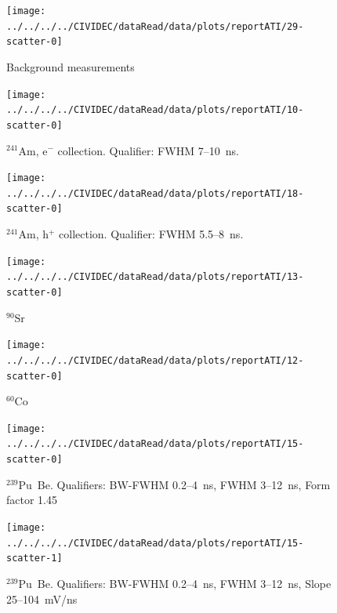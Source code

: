 \documentclass[12pt]{packages/mytustyle}  %
\begin{document}
 

% 

\clearpage
\begin{figure}[!t]
\centering
\texttt{[image: ../../../../CIVIDEC/dataRead/data/plots/reportATI/29-scatter-0]}
\caption{Background measurements}
\label{fig:scatterbm}
\end{figure}

\clearpage
\begin{figure}[!t]
\centering
\texttt{[image: ../../../../CIVIDEC/dataRead/data/plots/reportATI/10-scatter-0]}
\caption{$^{241}$Am, e$^{-}$ collection. Qualifier: FWHM 7--10~ns.}
\label{fig:scatterae}
\end{figure}

\clearpage
\begin{figure}[!t]
\centering
\texttt{[image: ../../../../CIVIDEC/dataRead/data/plots/reportATI/18-scatter-0]}
\caption{$^{241}$Am, h$^{+}$ collection. Qualifier: FWHM 5.5--8~ns.}
\label{fig:scatterah}
\end{figure}

\clearpage
\begin{figure}[!t]
\centering
\texttt{[image: ../../../../CIVIDEC/dataRead/data/plots/reportATI/13-scatter-0]}
\caption{$^{90}$Sr}
\label{fig:scattersr}
\end{figure}

\clearpage
\begin{figure}[!t]
\centering
\texttt{[image: ../../../../CIVIDEC/dataRead/data/plots/reportATI/12-scatter-0]}
\caption{$^{60}$Co}
\label{fig:scatterco}
\end{figure}

\clearpage
\begin{figure}[!t]
\centering
\texttt{[image: ../../../../CIVIDEC/dataRead/data/plots/reportATI/15-scatter-0]}
\caption{$^{239}$Pu~Be. Qualifiers: BW-FWHM 0.2--4~ns, FWHM 3--12~ns, Form factor 1.45}
\label{fig:scatterpu}
\end{figure}

\clearpage
\begin{figure}[!t]
\centering
\texttt{[image: ../../../../CIVIDEC/dataRead/data/plots/reportATI/15-scatter-1]}
\caption{$^{239}$Pu~Be. Qualifiers: BW-FWHM 0.2--4~ns, FWHM 3--12~ns, Slope 25--104~mV/ns}
\label{fig:scatterpu2}
\end{figure}

\clearpage
\end{document}
